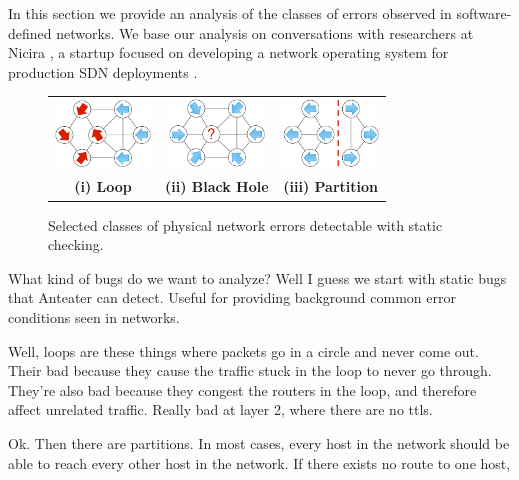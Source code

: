 
In this section we provide an analysis of the classes of errors observed in
software-defined networks. We base our analysis on conversations with
researchers at Nicira \cite{Nicira}, a startup focused on developing a network operating
system for production SDN deployments \cite{Onix}.

\begin{figure}[t]
    \centering
    \begin{tabular}{ccc}
    \hspace{-3pt}\includegraphics[width=1in]{../diagrams/bugs/loop.pdf}&
    \includegraphics[width=1in]{../diagrams/bugs/dead_end.pdf}&
    \includegraphics[width=1in]{../diagrams/bugs/partition.pdf}\\
    {\bf (i) Loop}&{\bf (ii) Black Hole}&{\bf (iii) Partition}\\
    \end{tabular}
    \caption[]{\label{fig:loop} Selected classes of physical network errors detectable with static
    checking.\vspace{-10pt}} 
\end{figure}


What kind of bugs do we want to analyze? Well I guess we start with static
bugs that Anteater can detect. Useful for providing background common error
conditions seen in networks. 

Well, loops are these things where packets go in a circle and never come out.
Their bad because they cause the traffic stuck in the loop to never go
through. They're also bad because they congest the routers in the loop, and
therefore affect unrelated traffic. Really bad at layer 2, where there are no
ttls.

Ok. Then there are partitions. In most cases, every host in the network should
be able to reach every other host in the network. If there exists no route to
one host, 

